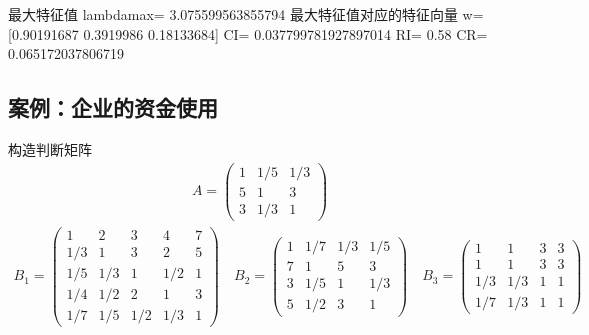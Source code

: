 \documentclass[letterpaper,10pt,english]{sphinxmanual}
\begin{document}
\begin{sphinxVerbatim}[commandchars=\\\{\}]
最大特征值 lambda\PYGZus{}max= 3.075599563855794
最大特征值对应的特征向量 w= [0.90191687 0.3919986  0.18133684]
CI= 0.037799781927897014
RI= 0.58
CR= 0.065172037806719
\end{sphinxVerbatim}


\subsection{案例：企业的资金使用}
\label{\detokenize{docs/evaluation_model:id22}}

构造判断矩阵
\begin{equation*}
\begin{split}
A=\left(\begin{array}{ccc}{1} & {1 / 5} & {1 / 3} \\ {5} & {1} & {3} \\ {3} & {1 / 3} & {1}\end{array}\right)
\end{split}
\end{equation*}\begin{equation*}
\begin{split}
B_{1}=\left(\begin{array}{ccccc}{1} & {2} & {3} & {4} & {7} \\ {1 / 3} & {1} & {3} & {2} & {5} \\ {1 / 5} & {1 / 3} & {1} & {1 / 2} & {1} \\ {1 / 4} & {1 / 2} & {2} & {1} & {3} \\ {1 / 7} & {1 / 5} & {1 / 2} & {1 / 3} & {1}\end{array}\right) \quad B_{2}=\left(\begin{array}{cccc}{1} & {1 / 7} & {1 / 3} & {1 / 5} \\ {7} & {1} & {5} & {3} \\ {3} & {1 / 5} & {1} & {1 / 3} \\ {5} & {1 / 2} & {3} & {1}\end{array}\right) \quad B_{3}=\left(\begin{array}{cccc}{1} & {1} & {3} & {3} \\ {1} & {1} & {3} & {3} \\ {1 / 3} & {1 / 3} & {1} & {1} \\ {1 / 7} & {1 / 3} & {1} & {1}\end{array}\right)
\end{split}
\end{equation*}
\end{document}
